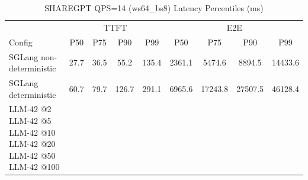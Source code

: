 \begin{table}[htbp]
\centering
\caption{SHAREGPT QPS=14 (ws64_bs8) Latency Percentiles (ms)}
\label{tab:sharegpt_qps14_ws64_bs8}
\begin{tabular}{l|cccc|cccc}
\toprule
& \multicolumn{4}{c|}{TTFT} & \multicolumn{4}{c}{E2E} \\
Config & P50 & P75 & P90 & P99 & P50 & P75 & P90 & P99 \\
\midrule
SGLang non-deterministic & 27.7 & 36.5 & 55.2 & 135.4 & 2361.1 & 5474.6 & 8894.5 & 14433.6 \\
SGLang deterministic & 60.7 & 79.7 & 126.7 & 291.1 & 6965.6 & 17243.8 & 27507.5 & 46128.4 \\
LLM-42 @2%
LLM-42 @5%
LLM-42 @10%
LLM-42 @20%
LLM-42 @50%
LLM-42 @100%
\bottomrule
\end{tabular}
\end{table}
